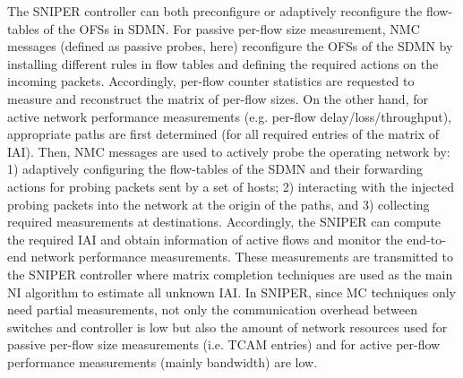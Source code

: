 The SNIPER controller can both preconfigure or adaptively reconfigure the flow-tables of the OFSs in SDMN. For passive per-flow size measurement, NMC messages (defined as passive probes, here) reconfigure the OFSs of the SDMN by installing different rules in flow tables and defining the required actions on the incoming packets. Accordingly, per-flow counter statistics are requested to measure and reconstruct the matrix of per-flow sizes. On the other hand, for active network performance measurements (e.g. per-flow delay/loss/throughput), appropriate paths are first determined (for all required entries of the matrix of IAI). Then, NMC messages are used to actively probe the operating network by: 1) adaptively configuring the flow-tables of the SDMN and their forwarding actions for probing packets sent by a set of hosts; 2) interacting with the injected probing packets into the network at the origin of the paths, and 3) collecting required measurements at destinations. Accordingly, the SNIPER can compute the required IAI and obtain information of active flows and monitor the end-to-end network performance measurements. These measurements are transmitted to the SNIPER controller where matrix completion techniques are used as the main NI algorithm to estimate all unknown IAI. In SNIPER, since MC techniques only need partial measurements, not only the communication overhead between switches and controller is low but also the amount of network resources used for passive per-flow size measurements (i.e. TCAM entries) and for active per-flow performance measurements (mainly bandwidth) are low.  

